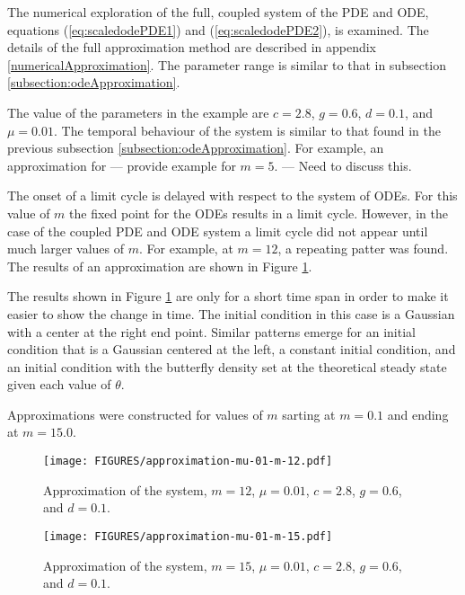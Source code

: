 \documentclass[review]{elsarticle}
\begin{document}
The numerical exploration of the full, coupled system of the PDE and
ODE, equations (\ref{eq:scaledodePDE1}) and (\ref{eq:scaledodePDE2}),
is examined. The details of the full approximation method are
described in appendix \ref{numericalApproximation}. The parameter
range is similar to that in subsection
\ref{subsection:odeApproximation}.

The value of the parameters in the example are $c=2.8$, $g=0.6$,
$d=0.1$, and $\mu=0.01$. The temporal behaviour of the system is
similar to that found in the previous subsection
\ref{subsection:odeApproximation}. For example, an approximation for
--- provide example for $m=5$. --- Need to discuss this.

The onset of a limit cycle is delayed with respect to the system of
ODEs. For this value of $m$ the fixed point for the ODEs results in a
limit cycle. However, in the case of the coupled PDE and ODE system a
limit cycle did not appear until much larger values of $m$. For
example, at $m=12$, a repeating patter was found. The results of an
approximation are shown in Figure \ref{fig:approximationM12Mu01}.

The results shown in Figure \ref{fig:approximationM12Mu01} are only
for a short time span in order to make it easier to show the change in
time. The initial condition in this case is a Gaussian with a center
at the right end point.  Similar patterns emerge for an initial
condition that is a Gaussian centered at the left, a constant initial
condition, and an initial condition with the butterfly density set at
the theoretical steady state given each value of $\theta$.


Approximations were constructed for
values of $m$ sarting at $m=0.1$ and ending at $m=15.0$.


\begin{figure}[htb]
  \centering
  \texttt{[image: FIGURES/approximation-mu-01-m-12.pdf]}
  \caption[Approximation with $m=12$ and $\mu=0.01$.]{Approximation of
    the system, $m=12$, $\mu=0.01$, $c=2.8$, $g=0.6$, and $d=0.1$. }
  \label{fig:approximationM12Mu01}
\end{figure}

\begin{figure}[htb]
  \centering
  \texttt{[image: FIGURES/approximation-mu-01-m-15.pdf]}
  \caption[Approximation with $m=15$ and $\mu=0.01$.]{Approximation of
    the system, $m=15$, $\mu=0.01$, $c=2.8$, $g=0.6$, and $d=0.1$. }
  \label{fig:approximationM15Mu01}
\end{figure}
\end{document}
